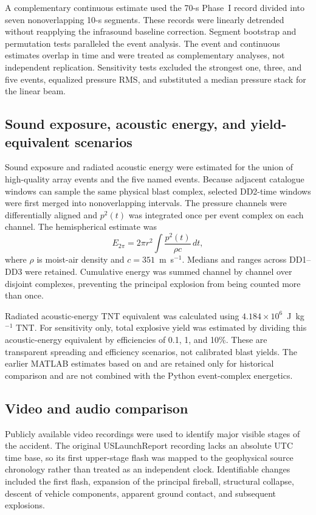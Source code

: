 \documentclass[]{seismica}
\begin{document}
A complementary continuous estimate used the 70-s Phase~I record divided into
seven nonoverlapping 10-s segments. These records were linearly detrended
without reapplying the infrasound baseline correction. Segment bootstrap and
permutation tests paralleled the event analysis. The event and continuous
estimates overlap in time and were treated as complementary analyses, not
independent replication. Sensitivity tests excluded the strongest one, three,
and five events, equalized pressure RMS, and substituted a median pressure
stack for the linear beam.

\subsection{Sound exposure, acoustic energy, and yield-equivalent scenarios}

Sound exposure and radiated acoustic energy were estimated for the union of
high-quality array events and the five named events. Because adjacent catalogue
windows can sample the same physical blast complex, selected DD2-time windows
were first merged into nonoverlapping intervals. The pressure channels were
differentially aligned and $p^2(t)$ was integrated once per event complex on
each channel. The hemispherical estimate was
\begin{equation}
  E_{2\pi}=2\pi r^2\int\frac{p^2(t)}{\rho c}\,dt,
  \label{eq:acoustic_energy}
\end{equation}
where $\rho$ is moist-air density and $c=351$~m~s$^{-1}$. Medians and ranges
across DD1--DD3 were retained. Cumulative energy was summed channel by channel
over disjoint complexes, preventing the principal explosion from being counted
more than once.

Radiated acoustic-energy TNT equivalent was calculated using
$4.184\times10^6$~J~kg$^{-1}$ TNT. For sensitivity only, total explosive yield
was estimated by dividing this acoustic-energy equivalent by efficiencies of
0.1, 1, and 10\%. These are transparent spreading and efficiency scenarios,
not calibrated blast yields. The earlier MATLAB estimates based on
\citet{johnson_aster_2005} and \citet{kanamori_1977} are retained only for
historical comparison and are not combined with the Python event-complex
energetics.

\subsection{Video and audio comparison}

Publicly available video recordings were used to identify major visible stages
of the accident. The original USLaunchReport recording
\citep{uslaunchreport_amos6_video_2016} lacks an absolute UTC time base, so
its first upper-stage flash was mapped to the geophysical source chronology
rather than treated as an independent clock. Identifiable changes included the
first flash, expansion of the principal fireball, structural collapse, descent
of vehicle components, apparent ground contact, and subsequent explosions.
\end{document}
